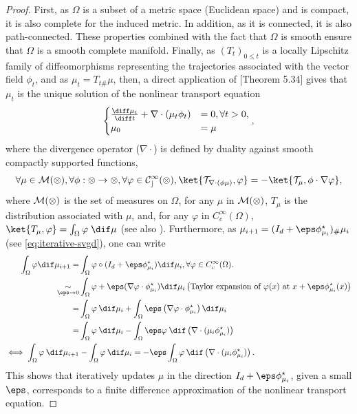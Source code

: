 \begin{proof}
  First, as $\Omega$ is a subset of a metric space (Euclidean space) and is compact, it is also complete for the induced metric. In addition, as it is connected, it is also path-connected. These properties combined with the fact that $\Omega$ is smooth ensure that $\Omega$ is a smooth complete manifold. Finally, as $(T_t)_{0 \leq t}$ is a locally Lipschitz family of diffeomorphisms representing the trajectories associated with the vector field $\phi_t$, and as $\mu_t = T_{t\#}\mu$, then, a direct application of \cite{Villani2003}[Theorem 5.34] gives that $\mu_t$ is the unique solution of the nonlinear transport equation
  $$
  \begin{cases}
    \frac{\diff \mu_t}{\diff t} + \nabla \cdot (\mu_t \phi_t) &= 0, \forall t > 0, \\
    \mu_0 &= \mu
  \end{cases},
  $$
  where the divergence operator ($\nabla \cdot$) is defined by duality against smooth compactly supported functions, \ie
  $$
  \forall \mu \in \cal{M}(\Omega), \forall \phi : \Omega \to \Omega, \forall \varphi \in C^\infty_c(\Omega), \ket{T_{\nabla \cdot (\phi \mu)}, \varphi} = - \ket{T_\mu, \phi \cdot \nabla \varphi},
  $$
  where $\cal{M}(\Omega)$ is the set of measures on $\Omega$, for any $\mu$ in $\cal{M}(\Omega)$, $T_\mu$ is the distribution associated with $\mu$, and, for any $\varphi$ in $C^\infty_c(\Omega)$, $\ket{T_\mu, \varphi} = \int_\Omega \varphi \; \dif \mu$ (see also \cite{Villani2009}).
%
  Furthermore, as $\mu_{i+1} = (I_d + \eps \phi_{\mu_i}^\star)_\# \mu_i$ (see \cref{eq:iterative-svgd}), one can write
  \begin{align*}
    \int_\Omega \varphi \/ \dif \mu_{i+1} = &\int_\Omega \varphi \circ (I_d + \eps \phi_{\mu_i}^\star) \dif \mu_i, \forall \varphi \in C^\infty_c(\Omega). \\
    \underset{\eps \to 0}{\sim} &\int_\Omega \varphi + \eps (\nabla \varphi \cdot \phi_{\mu_i}^\star) \dif \mu_i \left( \text{Taylor expansion of } \varphi(x) \text{ at } x + \eps \phi_{\mu_i}^\star(x) \right) \\
    = &\int_\Omega \varphi \: \dif \mu_i + \int_\Omega \eps \left( \nabla \varphi \cdot \phi_{\mu_i}^\star \right) \dif \mu_i \\
    = &\int_\Omega \varphi \: \dif \mu_i - \int_\Omega \eps \varphi \: \dif \left( \nabla \cdot (\mu_i \phi_{\mu_i}^\star) \right) \\
    \iff \int_\Omega \varphi \: \dif \mu_{i+1} &- \int_\Omega \varphi \: \dif \mu_i = - \eps \int_\Omega \varphi \: \dif \left( \nabla \cdot (\mu_i \phi_{\mu_i}^\star) \right). \\
  \end{align*}
  This shows that iteratively updates $\mu$ in the direction $I_d + \eps \phi_{\mu_i}^\star$, given a small $\eps$, corresponds to a finite difference approximation of the nonlinear transport equation.
\end{proof}